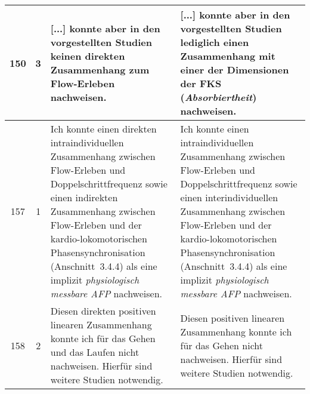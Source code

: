 \documentclass[12pt, twoside=semi, DIV=calc, pagesize, parskip=half, listof=totoc, bibliography=totoc, open=right, listof=nochaptergap, pointlessnumbers, final]{scrreprt}
\begin{document}
\begin{tabularx}{\textwidth}{|c|c|X|X|}
		\hline
		150 & 3 &  [...] konnte aber in den vorgestellten Studien keinen direkten Zusammenhang zum Flow-Erleben nachweisen. & [...] konnte aber in den vorgestellten Studien lediglich einen Zusammenhang mit einer der Dimensionen der FKS (\emph{Absorbiertheit}) nachweisen.\\
		\hline 
		157 & 1 & Ich konnte einen direkten intraindividuellen Zusammenhang zwischen Flow-Erleben und Doppelschrittfrequenz sowie einen indirekten Zusammenhang zwischen Flow-Erleben und der kardio-lokomotorischen Phasensynchronisation (Anschnitt~3.4.4) als eine implizit \emph{physiologisch messbare AFP} nachweisen. & Ich konnte einen intraindividuellen Zusammenhang zwischen Flow-Erleben und Doppelschrittfrequenz sowie einen interindividuellen Zusammenhang zwischen Flow-Erleben und der kardio-lokomotorischen Phasensynchronisation (Anschnitt~3.4.4) als eine implizit \emph{physiologisch messbare AFP} nachweisen.\\
		\hline
		158 & 2 & Diesen direkten positiven linearen Zusammenhang konnte ich für das Gehen und das Laufen nicht nachweisen. Hierfür sind weitere Studien notwendig. & Diesen positiven linearen Zusammenhang konnte ich für das Gehen nicht nachweisen. Hierfür sind weitere Studien notwendig.\\
		
		\hline
	\end{tabularx}

\setcounter{chapter}{5}
\setcounter{table}{5}
\end{document}
